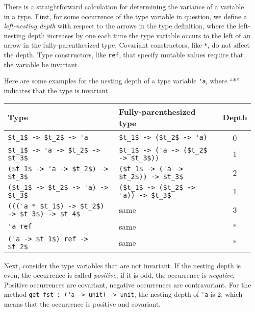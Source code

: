 There is a straightforward calculation for determining the variance of
a variable in a type.  First, for some occurrence of the type
variable in question, we define a \emph{left-nesting depth} with
respect to the arrows in the type definition, where the left-nesting
depth increases by one each time the type variable occurs to the left
of an arrow in the fully-parenthesized type.  Covariant constructors,
like \hbox{\lstinline$*$}, do not affect the depth.  Type
constructors, like \hbox{\lstinline$ref$}, that specify mutable values
require that the variable be invariant.

Here are some examples for the nesting depth of a type
variable \hbox{\lstinline$'a$}, where ``*'' indicates that the type is
invariant.

\begin{center}
\begin{tabular}{l|l|c}
Type & Fully-parenthesized type & Depth\\
\hline
\hbox{\lstinline/$t_1$ -> $t_2$ -> 'a/} & \hbox{\lstinline/$t_1$ -> ($t_2$ -> 'a)/} & 0\\
\hbox{\lstinline/$t_1$ -> 'a -> $t_2$ -> $t_3$/} & \hbox{\lstinline/$t_1$ -> ('a -> ($t_2$ -> $t_3$))/} & 1\\
\hbox{\lstinline/($t_1$ -> 'a -> $t_2$) -> $t_3$/} & \hbox{\lstinline/($t_1$ -> ('a -> $t_2$)) -> $t_3$/} & 2\\
\hbox{\lstinline/($t_1$ -> $t_2$ -> 'a) -> $t_3$/} & \hbox{\lstinline/($t_1$ -> ($t_2$ -> 'a)) -> $t_3$/} & 1\\
\hbox{\lstinline/((('a * $t_1$) -> $t_2$) -> $t_3$) -> $t_4$/} & same & 3\\
\hbox{\lstinline/'a ref/} & same & *\\
\hbox{\lstinline/('a -> $t_1$) ref -> $t_2$/} & same & *
\end{tabular}
\end{center}
%
Next, consider the type variables that are not invariant.  If the
nesting depth is even, the occurrence is called \emph{positive}; if it
is odd, the occurrence is \emph{negative}.  Positive occurrences are
covariant, negative occurrences are contravariant.  For the method
\hbox{\lstinline$get_fst : ('a -> unit) -> unit$},
the nesting depth of \hbox{\lstinline$'a$} is 2, which means that the
occurrence is positive and covariant.


